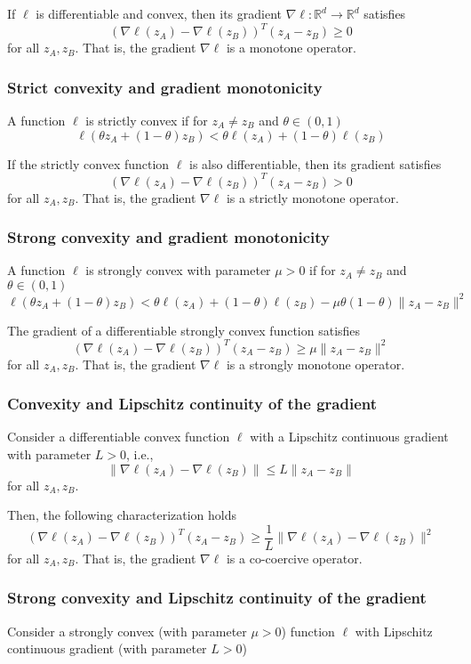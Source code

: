\documentclass[openany]{book}
\theoremstyle{definition}
\theoremstyle{remark}
\begin{document}
If $\ell$ is differentiable and convex, then its gradient $\nabla\ell: \mathbb{R}^d \to \mathbb{R}^d$ satisfies
\[
    (\nabla\ell(z_A) - \nabla\ell(z_B))^T(z_A - z_B) \geq 0
\]
for all $z_A, z_B$. That is, the gradient $\nabla\ell$ is a monotone operator.

\subsubsection{Strict convexity and gradient monotonicity}
A function $\ell$ is strictly convex if for $z_A \neq z_B$ and $\theta \in (0,1)$
\[
    \ell(\theta z_A + (1-\theta)z_B) < \theta\ell(z_A) + (1-\theta)\ell(z_B)
\]

If the strictly convex function $\ell$ is also differentiable, then its gradient satisfies
\[
    (\nabla\ell(z_A) - \nabla\ell(z_B))^T(z_A - z_B) > 0
\]
for all $z_A, z_B$. That is, the gradient $\nabla\ell$ is a strictly monotone operator.

\subsubsection{Strong convexity and gradient monotonicity}
A function $\ell$ is strongly convex with parameter $\mu > 0$ if for $z_A \neq z_B$ and $\theta \in (0,1)$
\[
    \ell(\theta z_A + (1-\theta)z_B) < \theta\ell(z_A) + (1-\theta)\ell(z_B) - \mu\theta(1-\theta)\|z_A - z_B\|^2
\]

The gradient of a differentiable strongly convex function satisfies
\[
    (\nabla\ell(z_A) - \nabla\ell(z_B))^T(z_A - z_B) \geq \mu\|z_A - z_B\|^2
\]
for all $z_A, z_B$. That is, the gradient $\nabla\ell$ is a strongly monotone operator.

\subsubsection{Convexity and Lipschitz continuity of the gradient}
Consider a differentiable convex function $\ell$ with a Lipschitz continuous gradient with parameter $L > 0$, i.e.,
\[
    \|\nabla\ell(z_A) - \nabla\ell(z_B)\| \leq L\|z_A - z_B\|
\]
for all $z_A, z_B$.

Then, the following characterization holds
\[
    (\nabla\ell(z_A) - \nabla\ell(z_B))^T(z_A - z_B) \geq \frac{1}{L}\|\nabla\ell(z_A) - \nabla\ell(z_B)\|^2
\]
for all $z_A, z_B$. That is, the gradient $\nabla\ell$ is a co-coercive operator.

\subsubsection{Strong convexity and Lipschitz continuity of the gradient}
Consider a strongly convex (with parameter $\mu > 0$) function $\ell$ with Lipschitz continuous gradient (with parameter $L > 0$)
\end{document}
